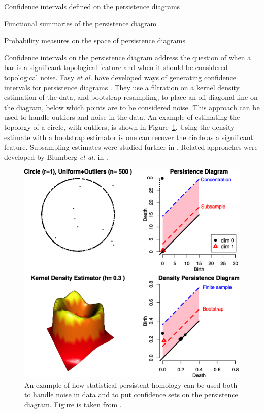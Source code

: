 \begin{compactenum}
\item Confidence intervals defined on the persistence diagrams
\item Functional summaries of the persistence diagram
\item Probability measures on the space of persistence diagrams
\end{compactenum}

Confidence intervals on the persistence diagram address the question of when a bar is a significant topological feature and when it should be considered topological noise.
Fasy \emph{et al.} have developed ways of generating confidence intervals for persistence diagrams \cite{Fasy:2014}.
They use a filtration on a kernel density estimation of the data, and bootstrap resampling, to place an off-diagonal line on the diagram, below which points are to be considered noise.
This approach can be used to handle outliers and noise in the data.
An example of estimating the topology of a circle, with outliers, is shown in Figure~\ref{fig:bg:fasy_confidence_set}.
Using the density estimate with a bootstrap estimator is one can recover the circle as a significant feature.
Subsampling estimates were studied further in \cite{Chazal:2014wp}.
Related approaches were developed by Blumberg \emph{et al.} in \cite{Blumberg:2014bq}.

\begin{figure}
	\centering
	\includegraphics[]{fig/background/fasy_confidence_set.pdf}
	\caption[Confidence sets on the persistence diagram]{An example of how statistical persistent homology can be used both to handle noise in data and to put confidence sets on the persistence diagram. Figure is taken from \cite{Fasy:2014}.}
	\label{fig:bg:fasy_confidence_set}
\end{figure}

